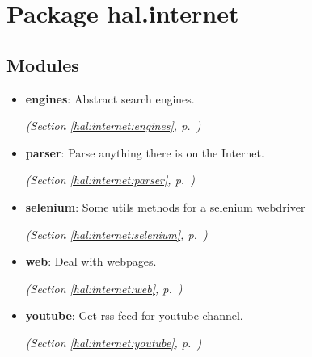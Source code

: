 %
%
%


\section{Package hal.internet}

    \label{hal:internet}


\subsection{Modules}

\begin{itemize}
\setlength{\parskip}{0ex}
\item \textbf{engines}: Abstract search engines. 


  \textit{(Section \ref{hal:internet:engines}, p.~\pageref{hal:internet:engines})}

\item \textbf{parser}: Parse anything there is on the Internet. 


  \textit{(Section \ref{hal:internet:parser}, p.~\pageref{hal:internet:parser})}

\item \textbf{selenium}: Some utils methods for a selenium webdriver 


  \textit{(Section \ref{hal:internet:selenium}, p.~\pageref{hal:internet:selenium})}

\item \textbf{web}: Deal with webpages. 


  \textit{(Section \ref{hal:internet:web}, p.~\pageref{hal:internet:web})}

\item \textbf{youtube}: Get rss feed for youtube channel. 


  \textit{(Section \ref{hal:internet:youtube}, p.~\pageref{hal:internet:youtube})}

\end{itemize}


